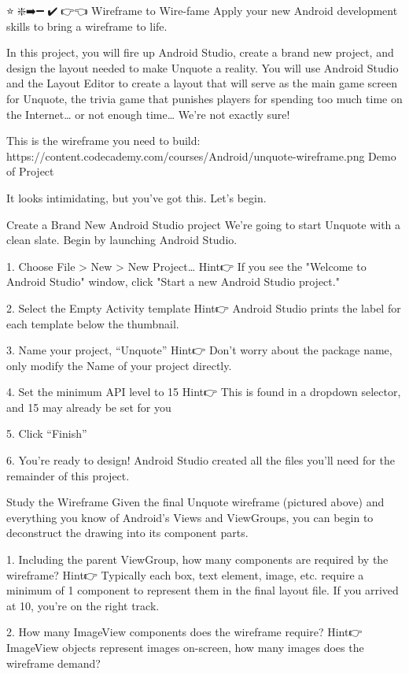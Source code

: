 ⭐🎨❇️➡️➖💎✔️🔗👉👈
Wireframe to Wire-fame
        Apply your new Android development skills to bring a wireframe to life.

        In this project, you will fire up Android Studio, create a brand new project, and design the layout needed to make Unquote a reality. You will use Android Studio and the Layout Editor to create a layout that will serve as the main game screen for Unquote, the trivia game that punishes players for spending too much time on the Internet… or not enough time… We’re not exactly sure!

        This is the wireframe you need to build:
            🎨https://content.codecademy.com/courses/Android/unquote-wireframe.png
                Demo of Project

        It looks intimidating, but you've got this. Let's begin.
        
Create a Brand New Android Studio project
        We’re going to start Unquote with a clean slate. Begin by launching Android Studio.

    1. Choose File > New > New Project…        
        Hint👉 If you see the "Welcome to Android Studio" window, click "Start a new Android Studio project."

    2. Select the Empty Activity template
        Hint👉 Android Studio prints the label for each template below the thumbnail.

    3. Name your project, “Unquote”
        Hint👉 Don't worry about the package name, only modify the Name of your project directly.
    
    4. Set the minimum API level to 15
        Hint👉 This is found in a dropdown selector, and 15 may already be set for you

    5. Click “Finish”
    
    6. You’re ready to design!
        Android Studio created all the files you’ll need for the remainder of this project.

Study the Wireframe
        Given the final Unquote wireframe (pictured above) and everything you know of Android’s Views and ViewGroups, you can begin to deconstruct the drawing into its component parts.

    1. Including the parent ViewGroup, how many components are required by the wireframe?
        Hint👉 Typically each box, text element, image, etc. require a minimum of 1 component to represent them in the final layout file. If you arrived at 10, you're on the right track.

    2. How many ImageView components does the wireframe require?
        Hint👉 ImageView objects represent images on-screen, how many images does the wireframe demand?

